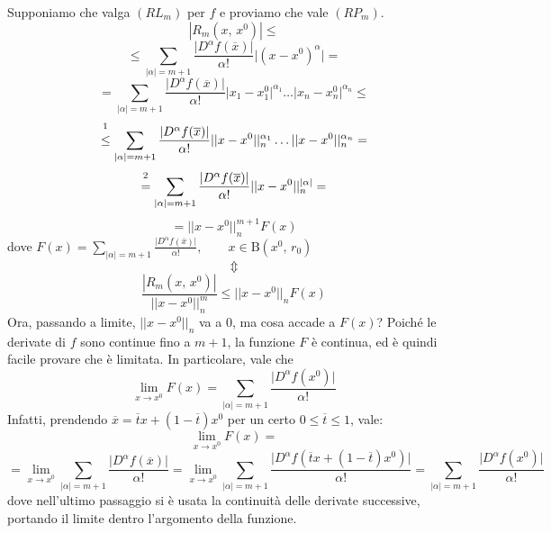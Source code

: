 \begin{obs}
Supponiamo che valga $(RL_m)$ per $f$ e proviamo che vale $(RP_m)$.
$$|R_m(x,\,x^0)| \leq$$
$$\leq \sum_{|\alpha| = m+1} \frac{\lvert D^{\alpha} f(\overline{x}) \rvert}{\alpha!} \lvert (x-x^0)^{\alpha} \rvert = $$
$$= \sum_{|\alpha| = m+1} \frac{\lvert D^{\alpha} f(\overline{x}) \rvert}{\alpha!} \lvert x_1-x^0_1 \rvert^{\alpha_1} \ldots \lvert x_n-x^0_n \rvert^{\alpha_n} \leq $$
$$ \overset{\footnotemark}{\leq} \sum_{|\alpha| = m+1} \frac{\lvert D^{\alpha} f(\overline{x}) \rvert}{\alpha!} \lvert\lvert x-x^0 \rvert\rvert^{\alpha_1}_n \ldots \lvert\lvert x-x^0 \rvert\rvert^{\alpha_n}_n = $$ 
$$ \overset{\footnotemark}{=} \sum_{|\alpha| = m+1} \frac{\lvert D^{\alpha} f(\overline{x}) \rvert}{\alpha!} \lvert\lvert x-x^0 \rvert\rvert^{|\alpha|}_n = $$ 
$$ = \lvert\lvert x-x^0 \rvert\rvert^{m+1}_n F(x)$$
dove $\displaystyle F(x) = \sum_{|\alpha| = m+1} \frac{\lvert D^{\alpha} f(\overline{x}) \rvert}{\alpha!}, \qquad x \in \mathrm{B}(x^0,\,r_0)$
$$
\Updownarrow
$$
$$
\frac{|R_m(x,\,x^0)|}{\lvert\lvert x-x^0 \rvert\rvert^{m}_n} \leq \lvert\lvert x-x^0 \rvert\rvert_n F(x)
$$
Ora, passando a limite, $\lvert\lvert x-x^0 \rvert\rvert_n$ va a $0$, ma cosa accade a $F(x)$? Poiché le derivate di $f$ sono continue fino a $m+1$, la funzione $F$ è continua, ed è quindi facile provare che è limitata. In particolare, vale che
$$
\lim_{x \rightarrow x^0} F(x) = \sum_{|\alpha| = m+1} \frac{\lvert D^{\alpha} f(x^0) \rvert}{\alpha!}
$$
Infatti, prendendo $\overline{x} = \overline{t}x+(1-\overline{t})x^0$ per un certo $0 \leq \overline{t} \leq 1$, vale:
$$
\lim_{x \rightarrow x^0} F(x) =$$
$$= \lim_{x \rightarrow x^0} \sum_{|\alpha| = m+1} \frac{\lvert D^{\alpha} f(\overline{x}) \rvert}{\alpha!} = \lim_{x \rightarrow x^0} \sum_{|\alpha| = m+1} \frac{\lvert D^{\alpha} f(\overline{t}x+(1-\overline{t})x^0) \rvert}{\alpha!} = \sum_{|\alpha| = m+1} \frac{\lvert D^{\alpha} f(x^0) \rvert}{\alpha!}
$$
dove nell'ultimo passaggio si è usata la continuità delle derivate successive, portando il limite dentro l'argomento della funzione.
\end{obs}

